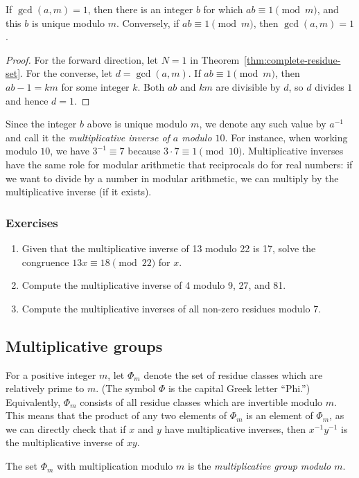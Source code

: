 \begin{corollary}
If $\gcd(a,m) = 1$, then there is an integer $b$ for which $ab\equiv 1\pmod{m}$, and this $b$ is unique modulo $m$. Conversely, if $ab\equiv 1\pmod{m}$, then $\gcd(a,m) = 1$.
\end{corollary}
\begin{proof}
For the forward direction, let $N = 1$ in Theorem~\ref{thm:complete-residue-set}. For the converse, let $d = \gcd(a,m)$. If $ab\equiv 1\pmod{m}$, then $ab - 1 = km$ for some integer $k$. Both $ab$ and $km$ are divisible by $d$, so $d$ divides $1$ and hence $d = 1$.
\end{proof}

Since the integer $b$ above is unique modulo $m$, we denote any such value by $a^{-1}$ and call it the \emph{multiplicative inverse of $a$ modulo $10$}. For instance, when working modulo $10$, we have $3^{-1}\equiv 7$ because $3\cdot 7\equiv 1\pmod{10}$. Multiplicative inverses have the same role for modular arithmetic that reciprocals do for real numbers: if we want to divide by a number in modular arithmetic, we can multiply by the multiplicative inverse (if it exists).

\subsubsection*{Exercises}

\begin{enumerate}
\item Given that the multiplicative inverse of 13 modulo 22 is 17, solve the congruence $13x\equiv 18\pmod{22}$ for $x$.
\item Compute the multiplicative inverse of 4 modulo 9, 27, and 81.
\item Compute the multiplicative inverses of all non-zero residues modulo 7.
\end{enumerate}


\subsection{Multiplicative groups}

For a positive integer $m$, let $\Phi_m$ denote the set of residue classes which are relatively prime to $m$. (The symbol $\Phi$ is the capital Greek letter ``Phi.'') Equivalently, $\Phi_m$ consists of all residue classes which are invertible modulo $m$. This means that the product of any two elements of $\Phi_m$ is an element of $\Phi_m$, as we can directly check that if $x$ and $y$ have multiplicative inverses, then $x^{-1}y^{-1}$ is the multiplicative inverse of $xy$.

\begin{definition}
The set $\Phi_m$ with multiplication modulo $m$ is the \emph{multiplicative group modulo $m$}.
\end{definition}


